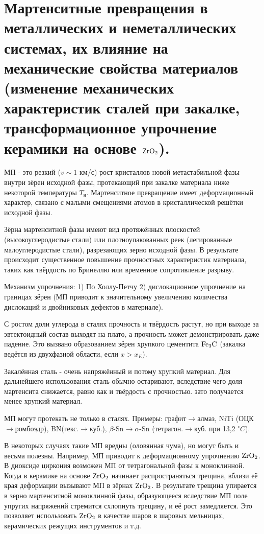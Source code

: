 \section{Мартенситные превращения в металлических и неметаллических
системах, их влияние на механические свойства материалов (изменение
механических характеристик сталей при закалке, трансформационное
упрочнение керамики на основе $\rm ZrO_2$).}
МП - это резкий ($v\sim 1$ км/с) рост кристаллов новой метастабильной фазы внутри зёрен исходной фазы, протекающий при закалке материала ниже некоторой температуры $T_\text{н}$. Мартенситное превращение имеет деформационный характер, связано с малыми смещениями атомов в кристаллической решётки исходной фазы. 
\par Зёрна мартенситной фазы имеют вид протяжённых плоскостей (высокоуглеродистые стали) или плотноупакованных реек (легированные малоуглеродистые стали), разрезающих зерно исходной фазы. В результате происходит существенное повышение прочностных характеристик материала, таких как твёрдость по Бринеллю или временное сопротивление разрыву.
\par
Механизм упрочнения: 1) По Холлу-Петчу 2) дислокационное упрочнение на границах зёрен (МП приводит к значительному увеличению количества дислокаций и двойниковых дефектов в материале). \par С ростом доли углерода в сталях прочность и твёрдость растут, но при выходе за эвтектоидный состав выходят на плато, а прочность может демонстрировать даже падение. Это вызвано образованием зёрен хрупкого цементита $\rm Fe_3C$ (закалка ведётся из двухфазной области, если $x>x_E$).
\par Закалённая сталь - очень напряжённый и потому хрупкий материал. Для дальнейшего использования сталь обычно остаривают, вследствие чего доля мартенсита снижается, равно как и твёрдость с прочностью. зато получается менее хрупкий материал.
\par
МП могут протекать не только в сталях. Примеры: графит$\rightarrow$алмаз, NiTi (ОЦК$\rightarrow$ромбоэдр), BN(гекс.$\rightarrow$куб.), $\beta$-Sn$\rightarrow$$\alpha$-Sn (тетрагон.$\rightarrow$куб. при 13,2 $^\circ C$).
\par В некоторых случаях такие МП вредны (оловянная чума), но могут быть и весьма полезны. Например, МП приводит к деформационному упрочнению $\rm ZrO_2$. В диоксиде циркония возможен МП от тетрагональной фазы к моноклинной. Когда в керамике на основе $\rm ZrO_2$ начинает распространяться трещина, вблизи её края деформации вызывают МП в зёрнах $\rm ZrO_2$. В результате трещина упирается в зерно мартенситной моноклинной фазы, образующееся вследствие МП поле упругих напряжений стремится схлопнуть трещину, и её рост замедляется. Это позволяет использовать $\rm ZrO_2$ в качестве шаров в шаровых мельницах, керамических режущих инструментов и т.д.
